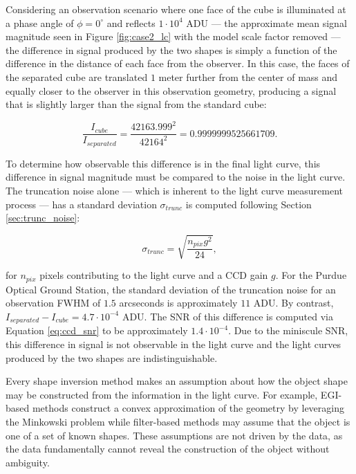 Considering an observation scenario where one face of the cube is illuminated at a phase angle of $\phi = 0^\circ$ and reflects $1\cdot10^4$ ADU --- the approximate mean signal magnitude seen in Figure \ref{fig:case2_lc} with the model scale factor removed --- the difference in signal produced by the two shapes is simply a function of the difference in the distance of each face from the observer. In this case, the faces of the separated cube are translated $1$ meter further from the center of mass and equally closer to the observer in this observation geometry, producing a signal that is slightly larger than the signal from the standard cube:

\begin{equation}
  \frac{I_{cube}}{I_{separated}} = \frac{42163.999^2}{42164^2} = 0.9999999525661709.
\end{equation}

To determine how observable this difference is in the final light curve, this difference in signal magnitude must be compared to the noise in the light curve. The truncation noise alone --- which is inherent to the light curve measurement process --- has a standard deviation $\sigma_{trunc}$ is computed following Section \ref{sec:trunc_noise}:

\begin{equation}
  \sigma_{trunc} = \sqrt{\frac{n_{pix} g^2}{24}},
\end{equation}

for $n_{pix}$ pixels contributing to the light curve and a CCD gain $g$. For the Purdue Optical Ground Station, the standard deviation of the truncation noise for an observation FWHM of $1.5$ arcseconds is approximately $11$ ADU. By contrast, $I_{separated}-I_{cube} = 4.7\cdot10^{-4}$ ADU. The SNR of this difference is computed via Equation \ref{eq:ccd_snr} to be approximately $1.4 \cdot 10^{-4}$. Due to the miniscule SNR, this difference in signal is not observable in the light curve and the light curves produced by the two shapes are indistinguishable.

Every shape inversion method makes an assumption about how the object shape may be constructed from the information in the light curve. For example, EGI-based methods construct a convex approximation of the geometry by leveraging the Minkowski problem while filter-based methods may assume that the object is one of a set of known shapes. These assumptions are not driven by the data, as the data fundamentally cannot reveal the construction of the object without ambiguity.

